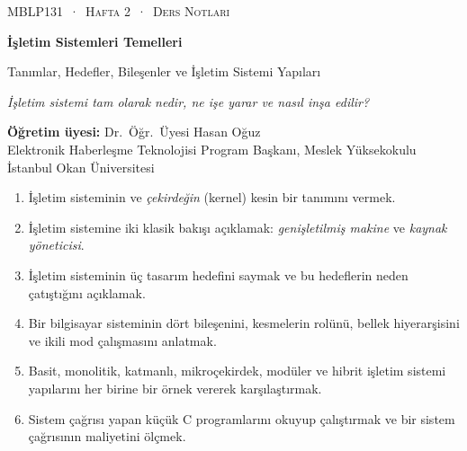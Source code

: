 \documentclass[11pt,a4paper]{article}
\begin{document}
\makeatletter
\lst@CCPut {}\z@
{}
\makeatother
\thispagestyle{empty}
\begin{tcolorbox}[enhanced,colback=dark,colframe=dark,arc=0pt,boxrule=0pt,
  left=18pt,right=18pt,top=20pt,bottom=20pt,coltext=white]
{\small\color{mint}\textsc{MBLP131 \,·\, Hafta 2 \,·\, Ders Notları}}\par\medskip
{\headfont\fontsize{26}{30}\selectfont\bfseries İşletim Sistemleri Temelleri}\par\medskip
{\large Tanımlar, Hedefler, Bileşenler ve İşletim Sistemi Yapıları}\par\smallskip
{\small\itshape\color{white!70} İşletim sistemi tam olarak nedir, ne işe yarar ve nasıl inşa edilir?}
\end{tcolorbox}

\vspace{0.4em}
\begin{minipage}[t]{0.70\linewidth}
\small
\textbf{Öğretim üyesi:} Dr.\ Öğr.\ Üyesi Hasan Oğuz\\
Elektronik Haberleşme Teknolojisi Program Başkanı, Meslek Yüksekokulu\\
İstanbul Okan Üniversitesi
\end{minipage}

\vspace{0.8em}
\begin{keyidea}
\begin{enumerate}[leftmargin=1.4em]
  \item İşletim sisteminin ve \emph{çekirdeğin} (kernel) kesin bir tanımını vermek.
  \item İşletim sistemine iki klasik bakışı açıklamak: \emph{genişletilmiş makine} ve \emph{kaynak yöneticisi}.
  \item İşletim sisteminin üç tasarım hedefini saymak ve bu hedeflerin neden çatıştığını açıklamak.
  \item Bir bilgisayar sisteminin dört bileşenini, kesmelerin rolünü, bellek hiyerarşisini ve ikili mod çalışmasını anlatmak.
  \item Basit, monolitik, katmanlı, mikroçekirdek, modüler ve hibrit işletim sistemi yapılarını her birine bir örnek vererek karşılaştırmak.
  \item Sistem çağrısı yapan küçük C programlarını okuyup çalıştırmak ve bir sistem çağrısının maliyetini ölçmek.
\end{enumerate}
\end{keyidea}
\end{document}
